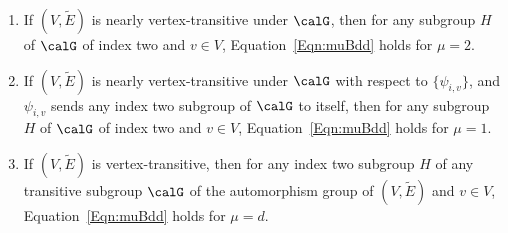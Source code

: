 \begin{proposition}
\label{Prop:Mu12d}
\quad
\begin{enumerate}
\item 
If $(V, \widetilde E)$ is nearly vertex-transitive under $\calG$, then for any subgroup $H$ of $\calG$ of index two and $v\in V$, Equation~\eqref{Eqn:muBdd} holds for $\mu = 2$. 
\item 
If $(V, \widetilde E)$ is nearly vertex-transitive under $\calG$ with respect to $\{\psi_{i,v}\}$, and $\psi_{i, v}$ sends any index two subgroup of $\calG$ to itself, then for any subgroup $H$ of $\calG$ of index two and $v\in V$, Equation~\eqref{Eqn:muBdd} holds for $\mu = 1$. 
\item 
If $(V, \widetilde E)$ is vertex-transitive, then for any index two subgroup $H$ of any transitive subgroup $\calG$ of the automorphism group of $(V, \widetilde E)$ and $v\in V$, Equation~\eqref{Eqn:muBdd} holds for $\mu = d$. 
\end{enumerate}
\end{proposition}


